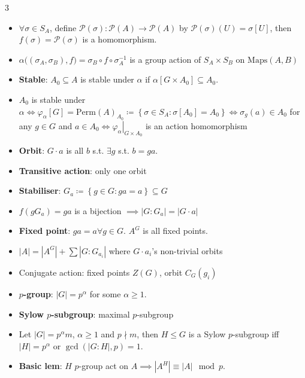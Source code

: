 \documentclass[10pt]{article}
\newcommand{\abs}[1]{\left\lvert#1\right\rvert} %
\begin{document}
\begin{multicols*}{3}
\begin{itemize}
            \item $\forall \sigma \in S_A$, define $\mathcal{P}\left(\sigma\right) \colon \mathcal{P}\left(A\right) \to \mathcal{P}\left(A\right)$ by $\mathcal{P}\left(\sigma\right)\left(U\right) = \sigma\left[U\right]$, then $f\left(\sigma\right) = \mathcal{P}\left(\sigma\right)$ is a homomorphism.
            \item $\alpha\bigl(\left(\sigma_A, \sigma_B\right), f\bigr) = \sigma_B \circ f \circ \sigma_A^{-1}$ is a group action of $S_A \times S_B$ on $\mathrm{Maps}\left(A, B\right)$
            \item \textbf{Stable}: $A_0 \subseteq A$ is stable under $\alpha$ if $\alpha\left[G \times A_0\right] \subseteq A_0$.
            \item $A_0$ is stable under $\alpha \iff \varphi_{\alpha}\left[G\right] = \mathrm{Perm}\left(A\right)_{A_0} \coloneqq \left\{\sigma \in S_A \colon \sigma\left[A_0\right] = A_0\right\}\iff\sigma_g\left(a\right) \in A_0$ for any $g \in G$ and $a \in A_0\iff\left.\varphi_{\alpha}\right\rvert_{G \times A_0}$ is an action homomorphism
            \item \textbf{Orbit}: $G \cdot a$ is all $b$ s.t. $\exists g$ s.t. $b = ga$.
            \item \textbf{Transitive action}: only one orbit
            \item \textbf{Stabiliser}: $G_a \coloneqq \left\{g \in G \colon ga = a\right\} \subseteq G$
            \item $f\left(gG_a\right) = ga$ is a bijection $\implies \abs{G \colon G_a} = \abs{G \cdot a}$
            \item \textbf{Fixed point}: $ga = a \forall g \in G$. $A^G$ is all fixed points.
            \item $\abs{A} = \abs{A^G} + \sum\abs{G \colon G_{a_i}}$ where $G \cdot a_i$'s non-trivial orbits
            \item Conjugate action: fixed points $Z\left(G\right)$, orbit $C_G\left(g_i\right)$
            \item \textbf{$p$-group}: $\abs{G} = p^{\alpha}$ for some $\alpha \geq 1$. 
            \item \textbf{Sylow $p$-subgroup}: maximal $p$-subgroup
            \item Let $\abs{G} = p^{\alpha}m$, $\alpha \geq 1$ and $p \nmid m$, then $H \leq G$ is a Sylow $p$-subgroup iff $\abs{H} = p^{\alpha}$ or $\gcd\left(\abs{G \colon H}, p\right) = 1$.
            \item \textbf{Basic lem}: $H$ $p$-group act on $A \implies \abs{A^H} \equiv \abs{A} \mod p$.

\end{itemize}
\end{multicols*}
\end{document}
